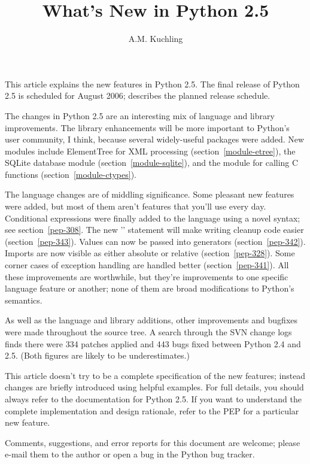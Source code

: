 \documentclass{howto}
\title{What's New in Python 2.5}
\author{A.M. Kuchling}
\begin{document}
\maketitle
\tableofcontents

This article explains the new features in Python 2.5.  The final
release of Python 2.5 is scheduled for August 2006;
 describes the planned release schedule.

The changes in Python 2.5 are an interesting mix of language and
library improvements. The library enhancements will be more important
to Python's user community, I think, because several widely-useful
packages were added.  New modules include ElementTree for XML
processing (section~\ref{module-etree}), the SQLite database module
(section~\ref{module-sqlite}), and the  module for
calling C functions (section~\ref{module-ctypes}).

The language changes are of middling significance.  Some pleasant new
features were added, but most of them aren't features that you'll use
every day.  Conditional expressions were finally added to the language
using a novel syntax; see section~\ref{pep-308}.  The new
'' statement will make writing cleanup code easier
(section~\ref{pep-343}).  Values can now be passed into generators
(section~\ref{pep-342}).  Imports are now visible as either absolute
or relative (section~\ref{pep-328}).  Some corner cases of exception
handling are handled better (section~\ref{pep-341}).  All these
improvements are worthwhile, but they're improvements to one specific
language feature or another; none of them are broad modifications to
Python's semantics.

As well as the language and library additions, other improvements and
bugfixes were made throughout the source tree.  A search through the
SVN change logs finds there were 334 patches applied and 443 bugs
fixed between Python 2.4 and 2.5.  (Both figures are likely to be
underestimates.)  

This article doesn't try to be a complete specification of the new
features; instead changes are briefly introduced using helpful
examples.  For full details, you should always refer to the
documentation for Python 2.5.
If you want to understand the complete implementation and design
rationale, refer to the PEP for a particular new feature.

Comments, suggestions, and error reports for this document are
welcome; please e-mail them to the author or open a bug in the Python
bug tracker.
\end{document}
